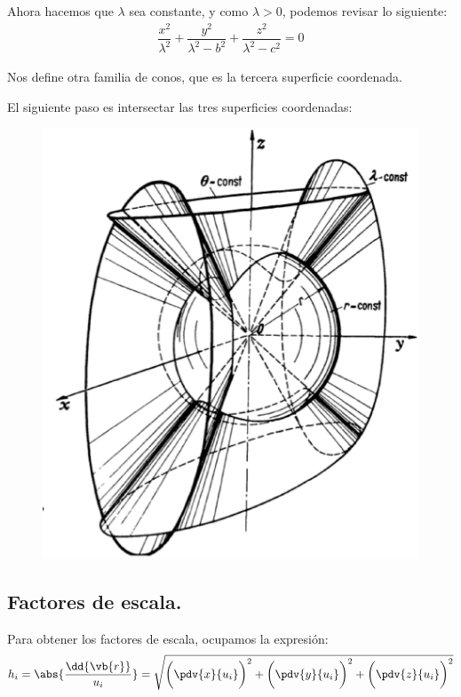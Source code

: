 Ahora hacemos que $\lambda$ sea constante, y como $\lambda > 0$, podemos revisar lo siguiente:
\begin{align*}
\dfrac{x^{2}}{\lambda^{2}} + \dfrac{y^{2}}{\lambda^{2} - b^{2}} + \dfrac{z^{2}}{\lambda^{2} - c^{2}} = 0
\end{align*}

Nos define otra familia de conos, que es la tercera superficie coordenada.

El siguiente paso es intersectar las tres superficies coordenadas:
\begin{figure}[H]
  \centering
  \includegraphics[scale=0.5]{Imagenes/Sistema_Conico.eps}
\end{figure}

\subsection{Factores de escala.}

Para obtener los factores de escala, ocupamos la expresión:
\begin{align*}
h_{i} =  \abs{\dfrac{\dd{\vb{r}}}{u_{i}}} =  \sqrt{\bigg( \pdv{x}{u_{i}} \bigg)^{2} + \bigg( \pdv{y}{u_{i}} \bigg)^{2} + \bigg( \pdv{z}{u_{i}} \bigg)^{2}}
\end{align*}

